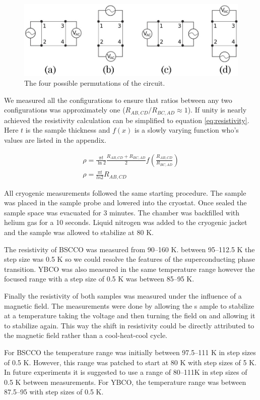 \documentclass[
reprint,
amsmath,amssymb,
aps,
tikz,
border=5pt
]{revtex4-1}
\begin{document}
    \begin{figure}
      \includegraphics[width= 0.45 \textwidth]{figures/4config.png}
      \caption{The four possible permutations of the circuit.}
      \label{fig:4config}
    \end{figure}

    We measured all the configurations to ensure that ratios between any two configurations was approximately one ($R_{AB,CD} / R_{BC, AD} \approx 1$). If unity is nearly achieved the resistivity calculation can be simplified to equation \ref{eq:resistivity}. Here $t$ is the sample thickness and $f(x)$ is a slowly varying function who's values are listed in the appendix. 

    \begin{gather}
      \rho = \frac{\pi t}{\ln 2}\frac{R_{AB,CD} + R_{BC, AD}}{2}f\left(\frac{R_{AB,CD}}{R_{BC, AD}}\right) \\
      \rho = \frac{\pi t}{ln2} R_{AB,CD} \label{eq:resistivity}
    \end{gather}


    All cryogenic measurements followed the same starting procedure. The sample was placed in the sample probe and lowered into the cryostat. Once sealed the sample space was evacuated for 3 minutes. The chamber was backfilled with helium gas for a 10 seconds. Liquid nitrogen was added to the cryogenic jacket and the sample was allowed to stabilize at 80 K.  

    The resistivity of BSCCO was measured from 90--160 K. between 95--112.5 K the step size was 0.5 K so we could resolve the features of the superconducting phase transition. YBCO was also measured  in the same temperature range however the focused range with a step size of 0.5 K was between 85--95 K.  

    Finally the resistivity of both samples was measured under the influence of a magnetic field. The measurements were done by allowing the s ample to stabilize at a temperature taking the voltage and then turning the field on and allowing it to stabilize again. This way the shift in resistivity could be directly attributed to the magnetic field rather than a cool-heat-cool cycle.  

    For BSCCO the temperature range was initially between 97.5--111 K in step sizes of  0.5 K. However, this range was patched to start at 80 K with step sizes of 5 K. In future experiments it is suggested to use a range of 80--111K in step sizes of 0.5 K between measurements. For YBCO, the temperature range was between 87.5--95 with step sizes of 0.5 K.
\end{document}
